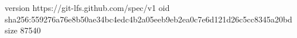 version https://git-lfs.github.com/spec/v1
oid sha256:559276a76e8b50ae34bc4edc4b2a05eeb9eb2ea0c7e6d121d26c5cc8345a20bd
size 87540
